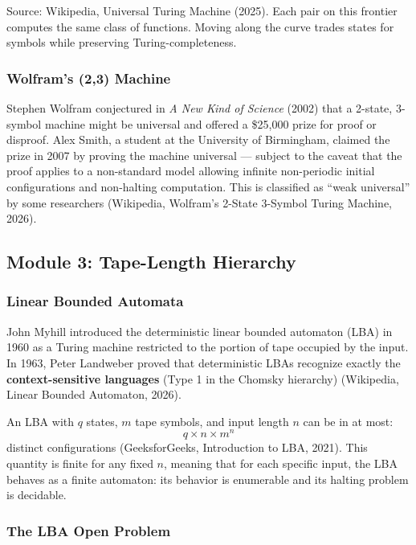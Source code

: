 \documentclass[11pt,letterpaper]{article}
\begin{document}
Source: Wikipedia, Universal Turing Machine (2025). Each pair on this frontier computes the same class of functions. Moving along the curve trades states for symbols while preserving Turing-completeness.

\subsubsection{Wolfram's (2,3) Machine}

Stephen Wolfram conjectured in \textit{A New Kind of Science} (2002) that a 2-state, 3-symbol machine might be universal and offered a \$25{,}000 prize for proof or disproof. Alex Smith, a student at the University of Birmingham, claimed the prize in 2007 by proving the machine universal --- subject to the caveat that the proof applies to a non-standard model allowing infinite non-periodic initial configurations and non-halting computation. This is classified as ``weak universal'' by some researchers (Wikipedia, Wolfram's 2-State 3-Symbol Turing Machine, 2026).

\subsection{Module 3: Tape-Length Hierarchy}

\subsubsection{Linear Bounded Automata}

John Myhill introduced the deterministic linear bounded automaton (LBA) in 1960 as a Turing machine restricted to the portion of tape occupied by the input. In 1963, Peter Landweber proved that deterministic LBAs recognize exactly the \textbf{context-sensitive languages} (Type 1 in the Chomsky hierarchy) (Wikipedia, Linear Bounded Automaton, 2026).

An LBA with $q$ states, $m$ tape symbols, and input length $n$ can be in at most:
\[
q \times n \times m^n
\]
distinct configurations (GeeksforGeeks, Introduction to LBA, 2021). This quantity is finite for any fixed $n$, meaning that for each specific input, the LBA behaves as a finite automaton: its behavior is enumerable and its halting problem is decidable.

\subsubsection{The LBA Open Problem}
\end{document}
